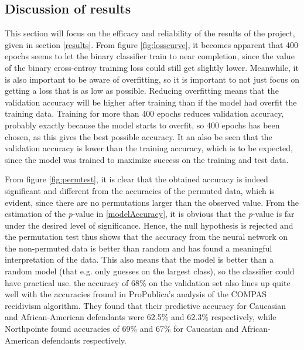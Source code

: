 \documentclass[11pt, fleqn, titlepage]{article}
\begin{document}
	\subsection{Discussion of results}\label{discussionOfResults}
	This section will focus on the efficacy and reliability of the results of the project, given in section \ref{results}. From figure \ref{fig:losscurve}, it becomes apparent that 400 epochs seems to let the binary classifier train to near completion, since the value of the binary cross-entroy training loss could still get slightly lower. Meanwhile, it is also important to be aware of overfitting, so it is important to not just focus on getting a loss that is as low as possible. Reducing overfitting means that the validation accuracy will be higher after training than if the model had overfit the training data. Training for more than 400 epochs reduces validation accuracy, probably exactly because the model starts to overfit, so 400 epochs has been chosen, as this gives the best possible accuracy. It an also be seen that the validation accuracy is lower than the training accuracy, which is to be expected, since the model was trained to maximize success on the training and test data.
	
	From figure \ref{fig:permtest}, it is clear that the obtained accuracy is indeed significant and different from the accuracies of the permuted data, which is evident, since there are no permutations larger than the observed value. From the estimation of the \textit{p}-value in \ref{modelAccuracy}, it is obvious that the \textit{p}-value is far under the desired level of significance. Hence, the null hypothesis is rejected and the permutation test thus shows that the accuracy from the neural network on the non-permuted data is better than random and has found a meaningful interpretation of the data. This also means that the model is better than a random model (that e.g. only guesses on the largest class), so the classifier could have practical use. the accuracy of 68\% on the validation set also lines up quite well with the accuracies fround in ProPublica's analysis of the COMPAS recidivism algorithm. They found that their predictive accuracy for Caucasian and African-American defendants were 62.5\% and 62.3\% respectively, while Northpointe found accuracies of 69\% and 67\% for Caucasian and African-American defendants respectively. \cite{propublicaAnalysis}
	
\end{document}
